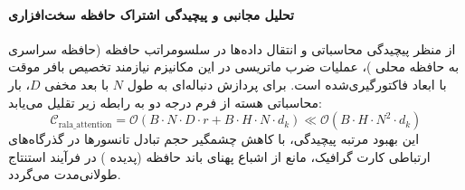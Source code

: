 \paragraph{تحلیل مجانبی و پیچیدگی اشتراک حافظه سخت‌افزاری}
از منظر پیچیدگی محاسباتی و انتقال داده‌ها در سلسومراتب حافظه (حافظه سراسری  به حافظه محلی )، عملیات ضرب ماتریسی در این مکانیزم نیازمند تخصیص بافر موقت با ابعاد فاکتورگیری‌شده است. برای پردازش دنباله‌ای به طول $N$ با بعد مخفی $D$، بار محاسباتی هسته از فرم درجه دو به رابطه زیر تقلیل می‌یابد:
\begin{equation}
\label{eq:complexity_rala_attention}
\mathcal{C}_{\text{rala\_attention}} = \mathcal{O}\left( B \cdot N \cdot D \cdot r + B \cdot H \cdot N \cdot d_k \right) \ll \mathcal{O}\left( B \cdot H \cdot N^2 \cdot d_k \right)
\end{equation}
این بهبود مرتبه پیچیدگی، با کاهش چشمگیر حجم تبادل تانسورها در گذرگاه‌های ارتباطی کارت گرافیک، مانع از اشباع پهنای باند حافظه (پدیده ) در فرآیند استنتاج طولانی‌مدت می‌گردد.